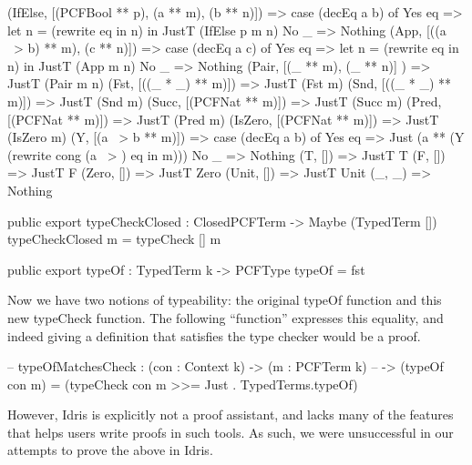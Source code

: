 \begin{code}
  (IfElse,  [(PCFBool ** p), (a ** m), (b ** n)]) 
      => case (decEq a b) of
            Yes eq => let n = (rewrite eq in n) in JustT (IfElse p m n)
            No  _  => Nothing
  (App,     [((a ~> b) ** m), (c ** n)])
      => case (decEq a c) of
            Yes eq => let n = (rewrite eq in n) in JustT (App m n)
            No  _  => Nothing
  (Pair,    [(_ ** m), (_ ** n)] )  => JustT (Pair m n)
  (Fst,     [((_ * _) ** m)])       => JustT (Fst m)
  (Snd,     [((_ * _) ** m)])       => JustT (Snd m)
  (Succ,    [(PCFNat ** m)])        => JustT (Succ m)
  (Pred,    [(PCFNat ** m)])        => JustT (Pred m)
  (IsZero,  [(PCFNat ** m)])        => JustT (IsZero m)
  (Y,       [(a ~> b ** m)])        => case (decEq a b) of
                                          Yes eq => Just (a ** (Y (rewrite cong (a ~> ) eq in m)))
                                          No  _  => Nothing
  (T,       [])                     => JustT T
  (F,       [])                     => JustT F
  (Zero,    [])                     => JustT Zero
  (Unit,    [])                     => JustT Unit
  (_, _)                            => Nothing
\end{code}

\begin{code}
public export
typeCheckClosed : ClosedPCFTerm -> Maybe (TypedTerm [])
typeCheckClosed m = typeCheck [] m
\end{code}

\begin{code}
public export
typeOf : TypedTerm k -> PCFType
typeOf = fst
\end{code}


Now we have two notions of typeability: the original typeOf function and this new typeCheck function.
The following ``function'' expresses this equality, and indeed giving a definition that satisfies the type checker would be a proof.
\begin{code}
-- typeOfMatchesCheck : (con : Context k) -> (m : PCFTerm k) 
--                        -> (typeOf con m) = (typeCheck con m >>= Just . TypedTerms.typeOf)
\end{code}
However, Idris is explicitly not a proof assistant, and lacks many of the features that helps users write proofs in such tools.
As such, we were unsuccessful in our attempts to prove the above in Idris.